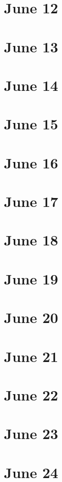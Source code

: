 \section{June 12}

\section{June 13}

\section{June 14}

\section{June 15}

\section{June 16}

\section{June 17}

\section{June 18}

\section{June 19}

\section{June 20}

\section{June 21}

\section{June 22}

\section{June 23}

\section{June 24}


